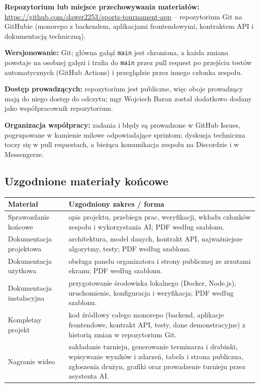 \documentclass[11pt,a4paper,oneside]{article}
\newif\ifpodpowiedzi
\newcommand{\podpowiedz}[1]{\ifpodpowiedzi\par\begingroup\small\color{hintcolor}\textit{Wskazówka: #1}\par\endgroup\fi}
\begin{document}
\textbf{Repozytorium lub miejsce przechowywania materiałów:}
\url{https://github.com/dawer2253/sports-tournament-app} -- repozytorium Git na GitHubie (monorepo z backendem, aplikacjami frontendowymi, kontraktem API i dokumentacją techniczną).\par

\textbf{Wersjonowanie:}
Git; główna gałąź \texttt{main} jest chroniona, a każda zmiana powstaje na osobnej gałęzi i trafia do \texttt{main} przez pull request po przejściu testów automatycznych (GitHub Actions) i przeglądzie przez innego członka zespołu.\par

\textbf{Dostęp prowadzących:}
repozytorium jest publiczne, więc oboje prowadzący mają do niego dostęp do odczytu; mgr Wojciech Baran został dodatkowo dodany jako współpracownik repozytorium.\par

\textbf{Organizacja współpracy:}
zadania i błędy są prowadzone w GitHub Issues, pogrupowane w kamienie milowe odpowiadające sprintom; dyskusja techniczna toczy się w pull requestach, a bieżąca komunikacja zespołu na Discordzie i w Messengerze.

\subsection{Uzgodnione materiały końcowe}
\podpowiedz{Uzupełnij tabelę z prowadzącymi. Sprawozdanie końcowe, kompletny projekt z plikami źródłowymi oraz nagranie są wymagane. Pozostałą dokumentację dostosujcie do projektu. Wpiszcie zakres i formę; przy dokumencie niewymaganym podajcie krótkie uzasadnienie.}
\begin{tabularx}{\textwidth}{@{}p{} Y@{}}
\toprule
Materiał & Uzgodniony zakres / forma\\
\midrule
Sprawozdanie końcowe & opis projektu, przebiegu prac, weryfikacji, wkładu członków zespołu i wykorzystania AI; PDF według szablonu.\\
Dokumentacja projektowa & architektura, model danych, kontrakt API, najważniejsze algorytmy, testy; PDF według szablonu.\\
Dokumentacja użytkowa & obsługa panelu organizatora i strony publicznej ze zrzutami ekranu; PDF według szablonu.\\
Dokumentacja instalacyjna & przygotowanie środowiska lokalnego (Docker, Node.js), uruchomienie, konfiguracja i weryfikacja; PDF według szablonu.\\
Kompletny projekt & kod źródłowy całego monorepo (backend, aplikacje frontendowe, kontrakt API, testy, dane demonstracyjne) z historią zmian w repozytorium Git.\\
Nagranie wideo & zakładanie turnieju, generowanie terminarza i drabinki, wpisywanie wyników i zdarzeń, tabela i strona publiczna, zgłoszenia drużyn, grafiki oraz prowadzenie turnieju przez asystenta AI.\\
\bottomrule
\end{tabularx}
\podpowiedz{Dokumenty przygotowuje się w LaTeX-u według udostępnionych szablonów i oddaje w PDF. Istotne późniejsze zmiany ustaleń wymagają uzgodnienia z prowadzącymi i odnotowania.}
\end{document}
